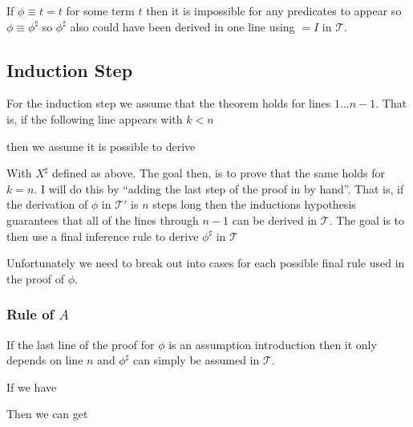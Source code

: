 \documentclass[12pt]{article}
\newcommand{\bv}[1]{\boldsymbol{#1}}
\newcommand{\mc}[1]{\mathcal{#1}}
\newcommand{\bc}[1]{\bv{\mc{#1}}}
\begin{document}
If $\phi\equiv t=t$ for some term $t$ then it is impossible for any predicates to appear so $\phi \equiv \phi^{\sharp}$ so $\phi^{\sharp}$ also could have been derived in one line using $=I$ in $\bc{T}$.

\subsection*{Induction Step}

For the induction step we assume that the theorem holds for lines $1\ldots n-1$. That is, if the following line appears with $k < n$

\begin{ND}[][][][][.6\linewidth]
\end{ND}

then we assume it is possible to derive

\begin{ND}[][][][][.6\linewidth]
\end{ND}

With $X^{\sharp}$ defined as above. The goal then, is to prove that the same holds for $k=n$. I will do this by ``adding the last step of the proof in by hand''. That is, if the derivation of $\phi$ in $\bc{T}'$ is $n$ steps long then the inductions hypothesis guarantees that all of the lines through $n-1$ can be derived in $\bc{T}$. The goal is to then use a final inference rule to derive $\phi^{\sharp}$ in $\bc{T}$

Unfortunately we need to break out into cases for each possible final rule used in the proof of $\phi$.

\hrulefill

\subsubsection{Rule of $A$}

If the last line of the proof for $\phi$ is an assumption introduction then it only depends on line $n$ and $\phi^{\sharp}$ can simply be assumed in $\bc{T}$.

If we have

\begin{ND}[][][][][.6\linewidth]
\end{ND}

Then we can get

\begin{ND}[][][][][.6\linewidth]
\end{ND}
\end{document}
